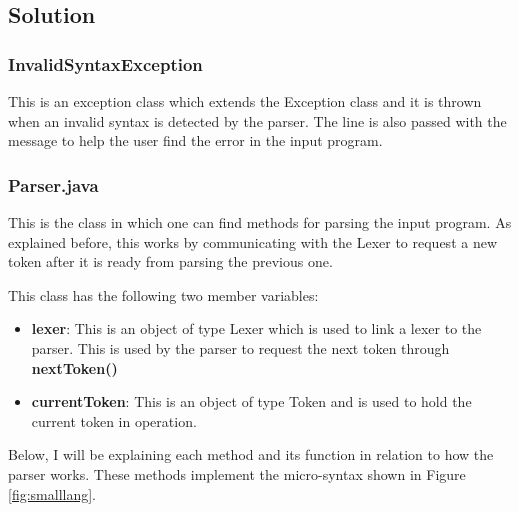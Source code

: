 \documentclass{article}
\begin{document}
				\subsection{Solution}
				
				\subsubsection{InvalidSyntaxException}
				
				This is an exception class which extends the Exception class and it is thrown when an invalid syntax is detected by the parser. The line is also passed with the message to help the user find the error in the input program.
				
				\subsubsection{Parser.java}
				
				This is the class in which one can find methods for parsing the input program. As explained before, this works by communicating with the Lexer to request a new token after it is ready from parsing the previous one. 
				
				This class has the following two member variables:
				
				\begin{itemize}
				
				\item \textbf{lexer}: This is an object of type Lexer which is used to link a lexer to the parser. This is used by the parser to request the next token through \textbf{nextToken()}
				\item \textbf{currentToken}: This is an object of type Token and is used to hold the current token in operation.
				\end{itemize}
				
				Below, I will be explaining each method and its function in relation to how the parser works. These methods implement the micro-syntax shown in Figure \ref{fig:smalllang}.
				
\end{document}
